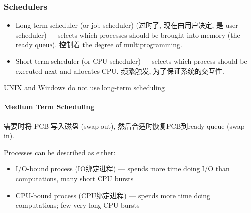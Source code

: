\subsubsection{Schedulers}
\begin{itemize}
    \item Long-term scheduler (or job scheduler) (过时了, 现在由用户决定, 是 user scheduler) --- selects which processes should be brought into memory (the ready queue). 控制着 the degree of multiprogramming. 
    \item Short-term scheduler (or CPU scheduler) --- selects which process should be executed next and allocates CPU. 频繁触发, 为了保证系统的交互性. 
\end{itemize}
UNIX and Windows do not use long-term scheduling

\paragraph{Medium Term Scheduling} 需要时将 PCB 写入磁盘 (swap out), 然后合适时恢复PCB到ready queue (swap in). 

Processes can be described as either:
\begin{itemize}
    \item I/O-bound process (IO绑定进程) --- spends more time doing I/O than
    computations, many short CPU bursts
    \item CPU-bound process (CPU绑定进程) --- spends more time doing
    computations; few very long CPU bursts
\end{itemize}


